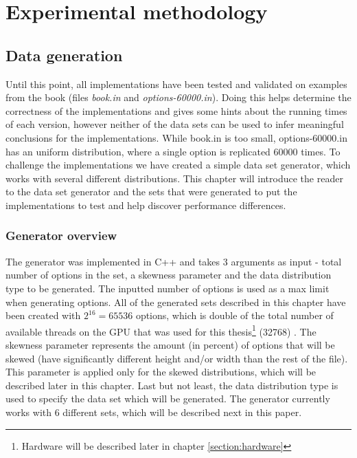 \chapter{Experimental methodology}
\label{chapter:experimentalmethodology}
\section{Data generation}
Until this point, all implementations have been tested and validated on examples from the book (files \textit{book.in} and \textit{options-60000.in}). Doing this helps determine the correctness of the implementations and gives some hints about the running times of each version, however neither of the data sets can be used to infer meaningful conclusions for the implementations. While book.in is too small, options-60000.in has an uniform distribution, where a single option is replicated 60000 times. To challenge the implementations we have created a simple data set generator, which works with several different distributions. This chapter will introduce the reader to the data set generator and the sets that were generated to put the implementations to test and help discover performance differences.   

\subsection{Generator overview}
The generator was implemented in C++ and takes 3 arguments as input - total number of options in the set, a skewness parameter and the data distribution type to be generated. The inputted number of options is used as a max limit when generating options. All of the generated sets described in this chapter have been created with $2^16=65536$ options, which is double of the total number of available threads on the GPU that was used for this thesis\footnote{Hardware will be described later in chapter \ref{section:hardware}} (32768) . The skewness parameter represents the amount (in percent) of options that will be skewed (have significantly different height and/or width than the rest of the file). This parameter is applied only for the skewed distributions, which will be described later in this chapter. Last but not least, the data distribution type is used to specify the data set which will be generated. The generator currently works with 6 different sets, which will be described next in this paper. 

